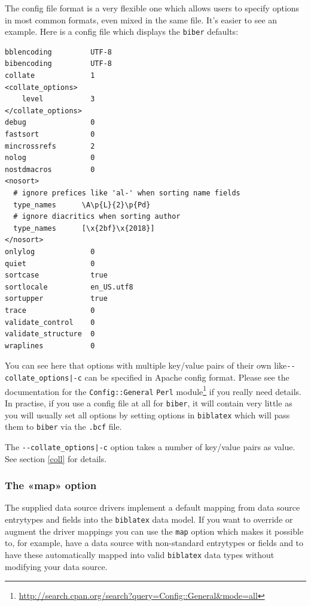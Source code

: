 \documentclass{ltxdockit}
\begin{document}
\noindent The config file format is a very flexible one which allows users to specify
options in most common formats, even mixed in the same file. It's easier to
see an example. Here is a config file which displays the \verb+biber+
defaults:

\begin{verbatim}
bblencoding         UTF-8
bibencoding         UTF-8
collate             1
<collate_options>
    level           3
</collate_options>
debug               0
fastsort            0
mincrossrefs        2
nolog               0
nostdmacros         0
<nosort>
  # ignore prefices like 'al-' when sorting name fields
  type_names      \A\p{L}{2}\p{Pd}
  # ignore diacritics when sorting author
  type_names      [\x{2bf}\x{2018}]
</nosort>
onlylog             0
quiet               0
sortcase            true
sortlocale          en_US.utf8
sortupper           true
trace               0
validate_control    0
validate_structure  0
wraplines           0
\end{verbatim}

\noindent You can see here that options with multiple key/value pairs of
their own like\linebreak[4] \verb+--collate_options|-c+ can be specified in
Apache config format. Please see the documentation
for the \verb+Config::General+ \verb+Perl+
module\footnote{\url{http://search.cpan.org/search?query=Config::General&mode=all}}
if you really need details. In practise, if you use a config file at all
for \verb+biber+, it will contain very little as you will usually set all
options by setting options in \verb+biblatex+ which will pass them to
\verb+biber+ via the \verb+.bcf+ file.

The \verb+--collate_options|-c+ option takes a number of key/value pairs as
value. See section \ref{coll} for details.

\subsubsection{The «map» option}

The supplied data source drivers implement a default mapping from
data source entrytypes and fields into the \verb+biblatex+ data model. If
you want to override or augment the driver mappings you can use the
\verb+map+ option which makes it possible to, for example, have a data
source with non-standard entrytypes or fields and to have these
automatically mapped into valid \verb+biblatex+ data types without
modifying your data source.
\end{document}
